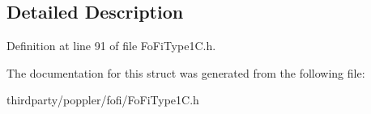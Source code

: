 \subsection{Detailed Description}


Definition at line 91 of file Fo\+Fi\+Type1\+C.\+h.



The documentation for this struct was generated from the following file\+:\begin{DoxyCompactItemize}
\item 
thirdparty/poppler/fofi/Fo\+Fi\+Type1\+C.\+h\end{DoxyCompactItemize}
